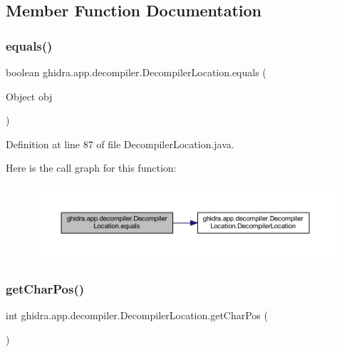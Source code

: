 \subsection{Member Function Documentation}
\mbox{\label{classghidra_1_1app_1_1decompiler_1_1_decompiler_location_ad1ff8d6f9e348e70c96427b12bd64113}} 
\subsubsection{\texorpdfstring{equals()}{equals()}}
{\footnotesize\ttfamily boolean ghidra.\+app.\+decompiler.\+Decompiler\+Location.\+equals (\begin{DoxyParamCaption}\item[{Object}]{obj }\end{DoxyParamCaption})\hspace{0.3cm}{\ttfamily [inline]}}



Definition at line 87 of file Decompiler\+Location.\+java.

Here is the call graph for this function\+:
\nopagebreak
\begin{figure}[H]
\begin{center}
\leavevmode
\includegraphics[width=350pt]{classghidra_1_1app_1_1decompiler_1_1_decompiler_location_ad1ff8d6f9e348e70c96427b12bd64113_cgraph}
\end{center}
\end{figure}
\mbox{\label{classghidra_1_1app_1_1decompiler_1_1_decompiler_location_ab30766b927c5c6a8a6b4ef2423d488a0}} 
\subsubsection{\texorpdfstring{getCharPos()}{getCharPos()}}
{\footnotesize\ttfamily int ghidra.\+app.\+decompiler.\+Decompiler\+Location.\+get\+Char\+Pos (\begin{DoxyParamCaption}{ }\end{DoxyParamCaption})\hspace{0.3cm}{\ttfamily [inline]}}



